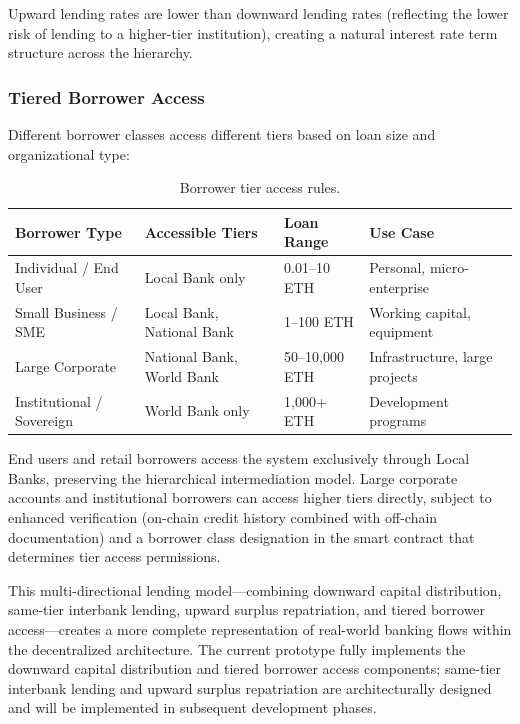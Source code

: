 \documentclass[12pt,a4paper]{report}
\newcommand{\tableheadfont}{\bfseries\small\color{PrimaryBlue}}
\newenvironment{moderntable}[1][H]{%
    \begin{table}[#1]\centering\small%
    \renewcommand{\arraystretch}{1.35}%
}{%
    \end{table}%
}
\begin{document}
Upward lending rates are lower than downward lending rates (reflecting the lower risk of lending to a higher-tier institution), creating a natural interest rate term structure across the hierarchy.

\subsubsection{Tiered Borrower Access}

Different borrower classes access different tiers based on loan size and organizational type:

\begin{moderntable}
\caption{Borrower tier access rules.}
\begin{tabular}{@{} >{\raggedright}p{3cm} >{\raggedright}p{3.5cm} >{\raggedright}p{2.5cm} >{\raggedright\arraybackslash}p{3cm} @{}}
\toprule
\tableheadfont Borrower Type & \tableheadfont Accessible Tiers & \tableheadfont Loan Range & \tableheadfont Use Case \\
\midrule
\rowcolor{RowShade}
Individual / End User & Local Bank only & 0.01--10 ETH & Personal, micro-enterprise \\
Small Business / SME & Local Bank, National Bank & 1--100 ETH & Working capital, equipment \\
\rowcolor{RowShade}
Large Corporate & National Bank, World Bank & 50--10,000 ETH & Infrastructure, large projects \\
Institutional / Sovereign & World Bank only & 1,000+ ETH & Development programs \\
\bottomrule
\end{tabular}
\end{moderntable}

End users and retail borrowers access the system exclusively through Local Banks, preserving the hierarchical intermediation model. Large corporate accounts and institutional borrowers can access higher tiers directly, subject to enhanced verification (on-chain credit history combined with off-chain documentation) and a borrower class designation in the smart contract that determines tier access permissions.

This multi-directional lending model---combining downward capital distribution, same-tier interbank lending, upward surplus repatriation, and tiered borrower access---creates a more complete representation of real-world banking flows within the decentralized architecture. The current prototype fully implements the downward capital distribution and tiered borrower access components; same-tier interbank lending and upward surplus repatriation are architecturally designed and will be implemented in subsequent development phases.
\end{document}
